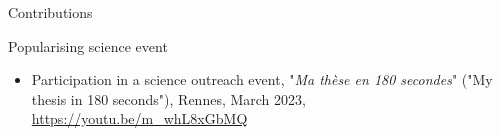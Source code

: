 \begin{frame}[allowframebreaks]{Contributions}
    \begin{block}{Popularising science event}
        \begin{itemize}
            \item {\small Participation in a science outreach event, "\textit{Ma thèse en 180 secondes}" ("My thesis in 180 seconds"), Rennes, March 2023, \url{https://youtu.be/m_whL8xGbMQ}}
        \end{itemize}
    \end{block}
\end{frame}
\begin{frame}{}
    \backpage
\end{frame}
